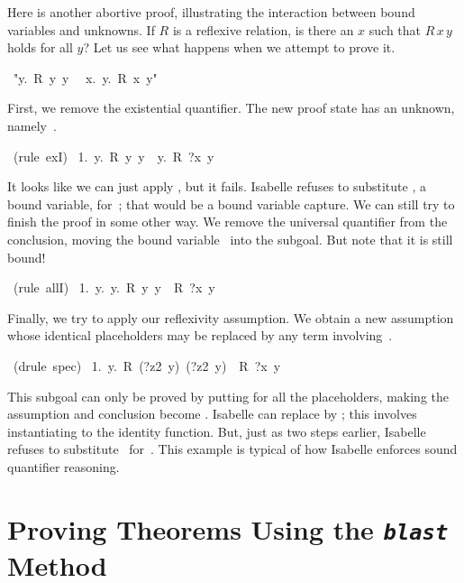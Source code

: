 \medskip 

Here is another abortive proof, illustrating the interaction between 
bound variables and unknowns.  
If $R$ is a reflexive relation, 
is there an $x$ such that $R\,x\,y$ holds for all $y$?  Let us see what happens when
we attempt to prove it. 
\begin{isabelle}
\ "\isasymforall y.\ R\ y\ y\ \isasymLongrightarrow 
\ \isasymexists x.\ \isasymforall y.\ R\ x\ y"
\end{isabelle}
First,  we remove the existential quantifier. The new proof state has  an
unknown, namely~. 
\begin{isabelle}
\ (rule\ exI)\isanewline
\ 1.\ \isasymforall y.\ R\ y\ y\ \isasymLongrightarrow \ \isasymforall y.\ R\ ?x\ y%
\end{isabelle}
It looks like we can just apply , but it fails.  Isabelle
refuses to substitute , a bound variable, for~; that would be
a bound variable capture.  We can still try to finish the proof in some
other way. We remove the universal quantifier  from the conclusion, moving
the bound variable~ into the subgoal.  But note that it is still
bound!
\begin{isabelle}
\ (rule\ allI)\isanewline
\ 1.\ \isasymAnd y.\ \isasymforall y.\ R\ y\ y\ \isasymLongrightarrow \ R\ ?x\ y%
\end{isabelle}
Finally, we try to apply our reflexivity assumption.  We obtain a 
new assumption whose identical placeholders may be replaced by 
any term involving~. 
\begin{isabelle}
\ (drule\ spec)\isanewline
\ 1.\ \isasymAnd y.\ R\ (?z2\ y)\ (?z2\ y)\ \isasymLongrightarrow\ R\ ?x\ y
\end{isabelle}
This subgoal can only be proved by putting  for all the placeholders,
making the assumption and conclusion become .  Isabelle can
replace  by ; this involves instantiating
 to the identity function.  But, just as two steps earlier,
Isabelle refuses to substitute~ for~.
This example is typical of how Isabelle enforces sound quantifier reasoning. 

\section{Proving Theorems Using the {\tt\slshape blast} Method}

